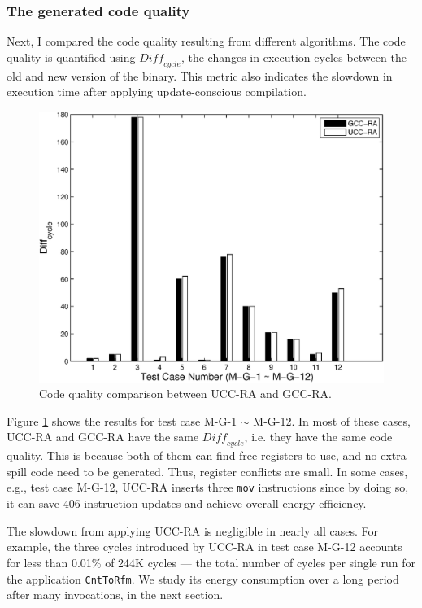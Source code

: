 \subsubsection{The generated code quality}\label{ucc-ra-code}
Next, I compared the code quality resulting from different
algorithms. The code quality is quantified using $\textit{Diff}_{cycle}$, the
changes in execution cycles between the old and new version of the
binary. This metric also indicates the slowdown in execution time
after applying update-conscious compilation.

\begin{figure}[htbp]
\centering
\includegraphics[scale=0.6]{figures/prof.eps}
\caption{Code quality comparison between UCC-RA and GCC-RA.}
\label{fexp.perf}
\end{figure}

Figure \ref{fexp.perf} shows the results for test case M-G-1 $\sim$ M-G-12. In
most of these cases, UCC-RA and GCC-RA have the same $\textit{Diff}_{cycle}$,
i.e. they have the same code quality. This is because both of them can
find free registers to use, and no extra spill code need to be
generated. Thus, register conflicts are small.  In some cases, e.g.,
test case M-G-12, UCC-RA inserts three {\tt mov} instructions since by
doing so, it can save 406 instruction updates and achieve overall
energy efficiency.

The slowdown from applying UCC-RA is negligible in nearly
all cases. For example, the three cycles introduced by UCC-RA in test
case M-G-12 accounts for less than 0.01\% of 244K cycles --- the total
number of cycles per single run for the application {\tt CntToRfm}. We
study its energy consumption over a long period after many
invocations, in the next section.

